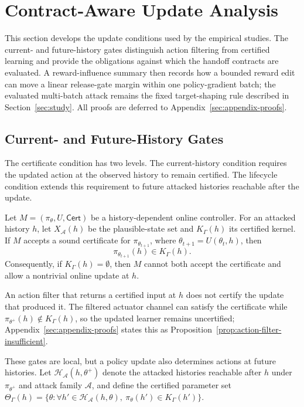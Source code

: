 \section{Contract-Aware Update Analysis}
\label{sec:gate}

This section develops the update conditions used by the empirical studies.
The current- and future-history gates distinguish action filtering from
certified learning and provide the obligations against which the handoff
contracts are evaluated.  A reward-influence summary
then records how a bounded reward edit can move a linear release-gate margin
within one policy-gradient batch; the evaluated multi-batch attack remains the
fixed target-shaping rule described in Section~\ref{sec:study}.  All proofs
are deferred to Appendix~\ref{sec:appendix-proofs}.

\subsection{Current- and Future-History Gates}

The certificate condition has two levels.  The current-history condition
requires the updated action at the observed history to remain certified.  The
lifecycle condition extends this requirement to future attacked histories
reachable after the update.

\begin{lemma}
\label{lem:current-gate}
Let $M=(\pi_\theta,U,\mathsf{Cert})$ be a history-dependent online controller.
For an attacked history $h$, let $X_{\mathcal A}(h)$ be the plausible-state set
and $K_\Gamma(h)$ its certified kernel.  If $M$ accepts a sound certificate for
$\pi_{\theta_{t+1}}$, where $\theta_{t+1}=U(\theta_t,h)$, then
\begin{equation}
    \pi_{\theta_{t+1}}(h)\in K_\Gamma(h).
\end{equation}
Consequently, if $K_\Gamma(h)=\emptyset$, then $M$ cannot both accept the certificate and allow a nontrivial online update at $h$.
\end{lemma}

An action filter that returns a certified input at $h$ does not certify the
update that produced it.  The filtered actuator channel can satisfy the
certificate while $\pi_{\theta^+}(h)\notin K_\Gamma(h)$, so the updated
learner remains uncertified; Appendix~\ref{sec:appendix-proofs} states this as
Proposition~\ref{prop:action-filter-insufficient}.

These gates are local, but a policy update also determines actions at future
histories.  Let
$\mathcal H_{\mathcal A}(h,\theta^+)$ denote the attacked histories reachable
after $h$ under $\pi_{\theta^+}$ and attack family $\mathcal A$, and define
the certified parameter set
$\Theta_\Gamma(h)=\{\theta:\forall h'\in\mathcal H_{\mathcal A}(h,\theta),\
\pi_\theta(h')\in K_\Gamma(h')\}$.

